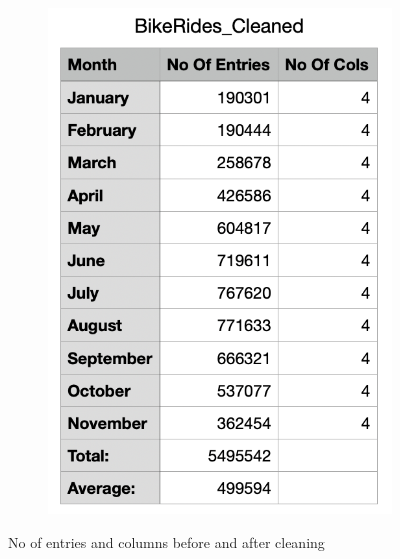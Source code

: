 \documentclass[12pt]{article}
\begin{document}
\begin{itemize}
\begin{figure}[h]
\begin{subfigure}{.4\textwidth}
		\includegraphics[scale=0.5]{img4.png}
	\end{subfigure}
	\caption{No of entries and columns before and after cleaning}
	\label{fig5}
	\end{figure}
	
	\end{itemize}

\pagebreak
	
\end{document}
